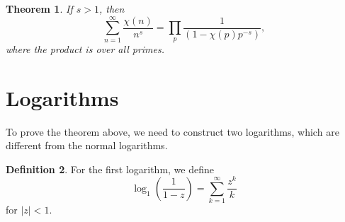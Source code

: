 \documentclass[psamsfonts]{amsart}
\newtheorem{thm}{Theorem}[section]
\theoremstyle{definition}
\newtheorem{defn}[thm]{Definition}
\theoremstyle{remark}
\numberwithin{equation}{section}
\begin{document}
			\begin{thm}
				If $s > 1$, then
				\begin{equation}
					\sum_{n=1}^{\infty} \frac{\chi(n)}{n^s} = \prod_{p} \frac{1}{(1-\chi(p)p^{-s})},
				\end{equation}
				where the product is over all primes.
			\end{thm}
			
		\section{Logarithms}
		To prove the theorem above, we need to construct two logarithms, which are different from the normal logarithms. 		
			\begin{defn}
				For the first logarithm, we define
				\begin{equation}
					\log_1(\frac{1}{1-z}) = \sum_{k=1}^{\infty} \frac{z^k}{k}
				\end{equation}
				for $|z| <1$.
			\end{defn}
			
\end{document}

